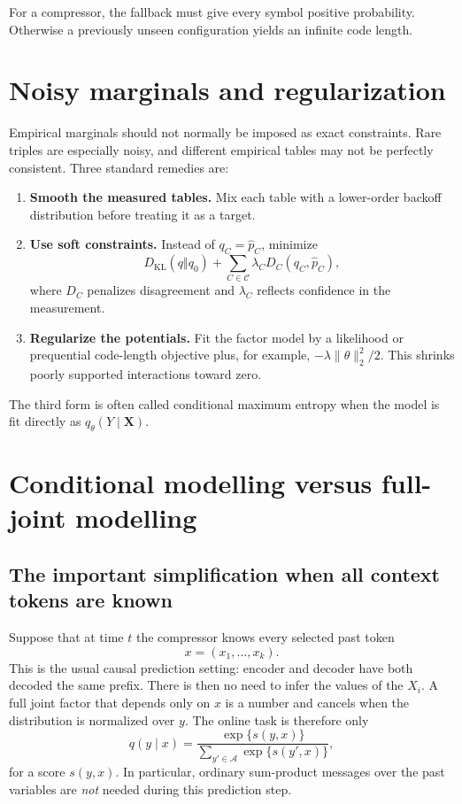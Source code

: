 \documentclass[11pt]{article}
\newcommand{\X}{\mathbf X}
\newcommand{\KL}{D_{\mathrm{KL}}}
\newcommand{\1}{\mathbf 1}
\newcommand{\mcC}{\mathcal C}
\newcommand{\mcA}{\mathcal A}
\newcommand{\hatp}{\widehat p}
\begin{document}
For a compressor, the fallback must give every symbol positive probability.
Otherwise a previously unseen configuration yields an infinite code length.

\section{Noisy marginals and regularization}
\label{sec:noisy}

Empirical marginals should not normally be imposed as exact constraints.
Rare triples are especially noisy, and different empirical tables may not be
perfectly consistent.  Three standard remedies are:
\begin{enumerate}
  \item \textbf{Smooth the measured tables.}  Mix each table with a lower-order
  backoff distribution before treating it as a target.
  \item \textbf{Use soft constraints.}  Instead of \(q_C=\hatp_C\), minimize
  \[
    \KL(q\Vert q_0)
    +
    \sum_{C\in\mcC}\lambda_C
    D_C(q_C,\hatp_C),
  \]
  where \(D_C\) penalizes disagreement and \(\lambda_C\) reflects confidence
  in the measurement.
  \item \textbf{Regularize the potentials.}  Fit the factor model by a
  likelihood or prequential code-length objective plus, for example,
  \(-\lambda\lVert\theta\rVert_2^2/2\).  This shrinks poorly supported
  interactions toward zero.
\end{enumerate}

The third form is often called conditional maximum entropy when the model is
fit directly as \(q_\theta(Y\mid \X)\).

\section{Conditional modelling versus full-joint modelling}

\subsection{The important simplification when all context tokens are known}

Suppose that at time \(t\) the compressor knows every selected past token
\[
  x=(x_1,\ldots,x_k).
\]
This is the usual causal prediction setting: encoder and decoder have both
decoded the same prefix.  There is then no need to infer the values of the
\(X_i\).  A full joint factor that depends only on \(x\) is a number and
cancels when the distribution is normalized over \(y\).  The online task is
therefore only
\[
  q(y\mid x)
  =
  \frac{\exp\{s(y,x)\}}
       {\sum_{y'\in\mcA}\exp\{s(y',x)\}},
  \label{eq:observed_context_softmax}
\]
for a score \(s(y,x)\).  In particular, ordinary sum-product messages over
the past variables are \emph{not} needed during this prediction step.
\end{document}
